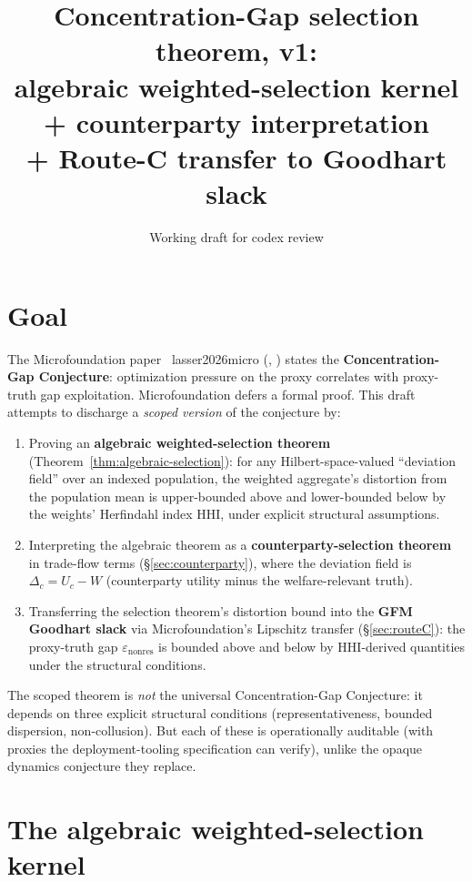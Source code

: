 \documentclass{article}
\title{Concentration-Gap selection theorem, v1: \\
algebraic weighted-selection kernel + counterparty interpretation \\
+ Route-C transfer to Goodhart slack}
\author{Working draft for codex review}
\date{}
\makeatletter
\newcommand{\citep}[2][]{%
  \begingroup
  \def\@tmpkey{#2}%
  \ifx\@tmpkey\@empty\else
    (\ifx\@empty#1\@empty\else #1, \fi
     \@nameuse{bibkey@\@tmpkey})%
  \fi
  \endgroup
}
\newcommand{\HHI}{\mathrm{HHI}}
\newcommand{\epsnonres}{\varepsilon_{\mathrm{nonres}}}
\makeatother
\begin{document}
\maketitle

\section{Goal}

The Microfoundation paper~\citep{lasser2026micro} states the
\textbf{Concentration-Gap Conjecture}: optimization pressure on
the proxy correlates with proxy-truth gap exploitation.
Microfoundation defers a formal proof.  This draft attempts to
discharge a \emph{scoped version} of the conjecture by:

\begin{enumerate}
\item Proving an \textbf{algebraic weighted-selection theorem}
  (Theorem~\ref{thm:algebraic-selection}): for any
  Hilbert-space-valued ``deviation field'' over an indexed
  population, the weighted aggregate's distortion from the
  population mean is upper-bounded above and lower-bounded below
  by the weights' Herfindahl index $\HHI$, under explicit
  structural assumptions.

\item Interpreting the algebraic theorem as a
  \textbf{counterparty-selection theorem} in trade-flow terms
  (\S\ref{sec:counterparty}), where the deviation field is
  $\Delta_c = U_c - W$ (counterparty utility minus the
  welfare-relevant truth).

\item Transferring the selection theorem's distortion bound into
  the \textbf{GFM Goodhart slack} via Microfoundation's Lipschitz
  transfer (\S\ref{sec:routeC}): the proxy-truth gap
  $\epsnonres$ is bounded above and below by $\HHI$-derived
  quantities under the structural conditions.
\end{enumerate}

The scoped theorem is \emph{not} the universal Concentration-Gap
Conjecture: it depends on three explicit structural conditions
(representativeness, bounded dispersion, non-collusion).  But
each of these is operationally auditable (with proxies the
deployment-tooling specification can verify), unlike the
opaque dynamics conjecture they replace.

\section{The algebraic weighted-selection kernel}
\end{document}
